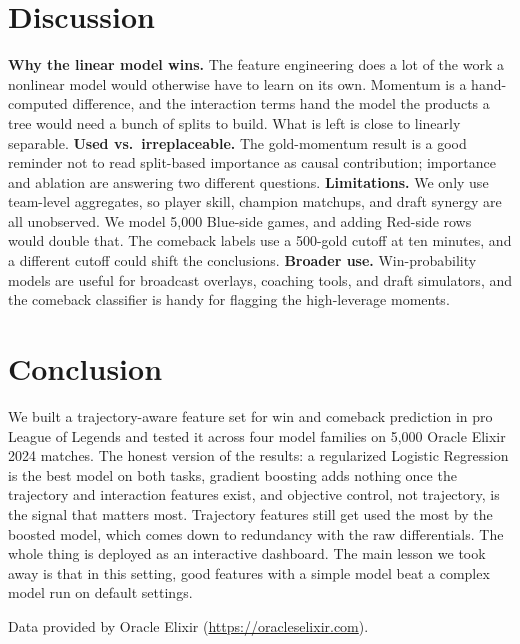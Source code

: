 \documentclass[sigconf,nonacm]{acmart}
\begin{document}
\section{Discussion}
\textbf{Why the linear model wins.} The feature engineering does a lot of the work a nonlinear
model would otherwise have to learn on its own. Momentum is a hand-computed difference, and the
interaction terms hand the model the products a tree would need a bunch of splits to build. What is
left is close to linearly separable. \textbf{Used vs.\ irreplaceable.} The gold-momentum result is
a good reminder not to read split-based importance as causal contribution; importance and ablation
are answering two different questions. \textbf{Limitations.} We only use team-level aggregates, so
player skill, champion matchups, and draft synergy are all unobserved. We model 5{,}000 Blue-side
games, and adding Red-side rows would double that. The comeback labels use a 500-gold cutoff at ten
minutes, and a different cutoff could shift the conclusions. \textbf{Broader use.} Win-probability
models are useful for broadcast overlays, coaching tools, and draft simulators, and the comeback
classifier is handy for flagging the high-leverage moments.

\section{Conclusion}
We built a trajectory-aware feature set for win and comeback prediction in pro League of Legends
and tested it across four model families on 5{,}000 Oracle Elixir 2024 matches. The honest version
of the results: a regularized Logistic Regression is the best model on both tasks, gradient
boosting adds nothing once the trajectory and interaction features exist, and objective control,
not trajectory, is the signal that matters most. Trajectory features still get used the most by the
boosted model, which comes down to redundancy with the raw differentials. The whole thing is
deployed as an interactive dashboard. The main lesson we took away is that in this setting, good
features with a simple model beat a complex model run on default settings.

\begin{acks}
Data provided by Oracle Elixir (\url{https://oracleselixir.com}).
\end{acks}
\end{document}
